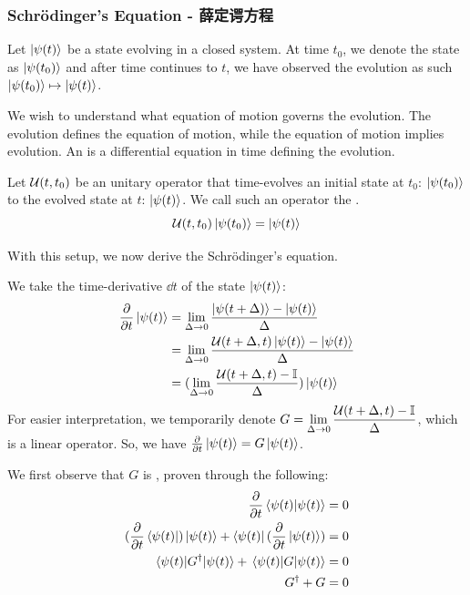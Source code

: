 \subsubsection{Schr\"odinger's Equation - 薛定谔方程}
Let $\ket{\psi(t)}$ be a  state evolving  in a closed system. At time $t_0$, we denote the state as $\ket{\psi(t_0)}$ and after time continues to $t$, we have observed the evolution as such $\ket{\psi(t_0)} \mapsto \ket{\psi(t)}$. \par
We wish to understand what equation of motion governs the evolution. The evolution defines the equation of motion, while the equation of motion implies evolution. An  is a differential equation in time defining the evolution. \par
\begin{definition}
    Let $\mathcal{U}(t, t_0)$ be an unitary operator that time-evolves an initial state at $t_0$: $\ket{\psi(t_0)}$ to the evolved state at $t$: $\ket{\psi(t)}$. We call such an operator the .
    $$\mathcal{U}(t, t_0)\ket{\psi(t_0)} = \ket{\psi(t)}$$
\end{definition}
With this setup, we now derive the Schr\"odinger's equation. \par
We take the time-derivative $\dd t$ of the state $\ket{\psi(t)}$:
\begin{align*}
    \pdv{t} \ket{\psi(t)} &= \lim_{\Delta \to 0} \frac{\ket{\psi(t + \Delta)} - \ket{\psi(t)}}{\Delta} \\
    &= \lim_{\Delta \to 0} \frac{\mathcal{U}(t+\Delta, t)\ket{\psi(t)} - \ket{\psi(t)}}{\Delta} \\
    &= (\lim_{\Delta \to 0} \frac{\mathcal{U}(t+\Delta, t) - \mathbb{I}}{\Delta})\ket{\psi(t)}
\end{align*}
For easier interpretation, we temporarily denote $\displaystyle G = \lim_{\Delta \to 0} \frac{\mathcal{U}(t+\Delta, t) - \mathbb{I}}{\Delta}$, which is a linear operator. So, we have $\pdv{t} \ket{\psi(t)} = G \ket{\psi(t)}$. \par
We first observe that $G$ is , proven through the following:
\begin{align*}
    \pdv{t} \braket{\psi(t)} &= 0 \\
    (\pdv{t}\bra{\psi(t)})\ket{\psi(t)} + \bra{\psi(t)}(\pdv{t} \ket{\psi(t)}) &= 0 \\
    \ev{\conjt{G}}{\psi(t)} + \ev{G}{\psi(t)} &= 0 \\
    \conjt{G} + G &= 0
\end{align*}
